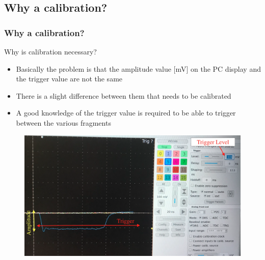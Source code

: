 \subsection{Why a calibration?}
\begin{frame} [fragile]
\small
	\frametitle{Why a calibration?}
			
	\begin{alertblock}{Why is calibration necessary?}
		\begin{itemize}
			\item Basically the problem is that the amplitude value [mV] on the PC display and the trigger value are not the same
			\item There is a slight difference between them that needs to be calibrated
			\item A good knowledge of the trigger value is required to be able to trigger between the various fragments
		\end{itemize}
	\end{alertblock}
	    	
		\begin{figure}
		\centering
			\includegraphics[scale=0.17]{photos/why_im.png}
		\end{figure}

	
	
\end{frame}
